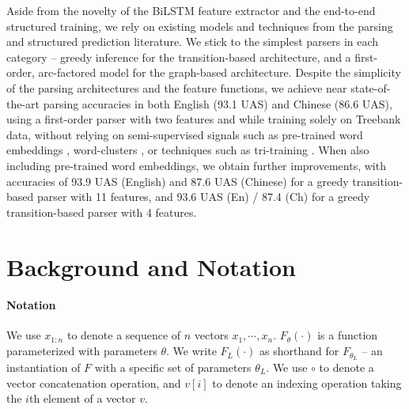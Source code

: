 \documentclass[11pt]{article}
\begin{document}
Aside from the novelty of the BiLSTM feature extractor and the end-to-end
structured training, we rely on existing models and techniques from
the parsing and structured prediction literature.
We stick to the simplest
parsers in each category -- greedy inference for the transition-based
architecture, and a first-order, arc-factored model for the graph-based
architecture.
Despite the simplicity of the parsing architectures and the
feature functions, we achieve near state-of-the-art parsing accuracies in both English
(93.1 UAS) and
Chinese (86.6 UAS), using a first-order parser with two features and while
training solely on Treebank data, without relying on semi-supervised signals such as pre-trained word
embeddings \cite{chen2014fast}, word-clusters \cite{koo2008semisup}, or
techniques such as tri-training \cite{weiss2015structured}.  When also including
pre-trained word embeddings, we obtain further improvements, with accuracies of
93.9 UAS (English) and 87.6 UAS (Chinese) for a greedy transition-based parser
with 11 features, and 93.6 UAS (En) / 87.4 (Ch) for a greedy transition-based
parser with 4 features.

 
\section{Background and Notation}
\paragraph{Notation} We use $x_{1:n}$ to denote a sequence of $n$ vectors $x_1,\cdots,x_n$.
$F_{\theta}(\cdot)$ is a function parameterized with parameters $\theta$.
We write $F_{L}(\cdot)$ as shorthand for $F_{\theta_L}$ -- an instantiation of $F$
with a specific set of parameters $\theta_L$.  We use $\circ$ to denote a vector
concatenation operation, and $v[i]$ to denote an indexing operation taking the
$i$th element of a vector $v$.
\end{document}
